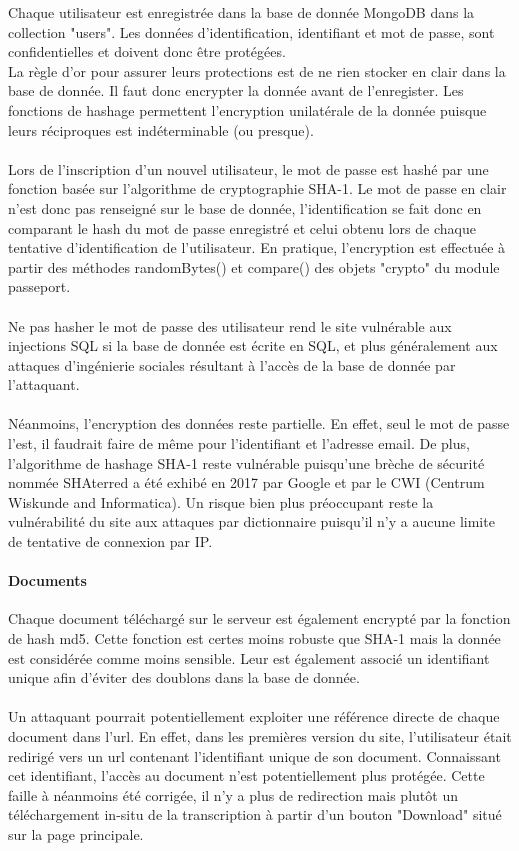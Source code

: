 \documentclass[oneside,a4paper,13pt]{article}
\begin{document}
Chaque utilisateur est enregistrée dans la base de donnée MongoDB dans la collection "users". Les données d'identification, identifiant et mot de passe, sont confidentielles et doivent donc être protégées. \\
La règle d'or pour assurer leurs protections est de ne rien stocker en clair dans la base de donnée. Il faut donc encrypter la donnée avant de l'enregister. Les fonctions de hashage permettent l'encryption unilatérale de la donnée puisque leurs réciproques est indéterminable (ou presque). \\ \\
Lors de l'inscription d'un nouvel utilisateur, le mot de passe est hashé par une fonction basée sur l'algorithme de cryptographie SHA-1. Le mot de passe en clair n'est donc pas renseigné sur le base de donnée, l'identification se fait donc en comparant le hash du mot de passe enregistré et celui obtenu lors de chaque tentative d'identification de l'utilisateur. En pratique, l'encryption est effectuée à partir des méthodes randomBytes() et compare() des objets "crypto" du module passeport.\\ \\
Ne pas hasher le mot de passe des utilisateur rend le site vulnérable aux injections SQL si la base de donnée est écrite en SQL, et plus généralement aux attaques d'ingénierie sociales résultant à l'accès de la base de donnée par l'attaquant. \\ \\
Néanmoins, l'encryption des données reste partielle. En effet, seul le mot de passe l'est, il faudrait faire de même pour l'identifiant et l'adresse email. De plus, l'algorithme de hashage SHA-1 reste vulnérable puisqu'une brèche de sécurité nommée SHAterred a été exhibé en 2017 par Google et par le CWI (Centrum Wiskunde and Informatica). Un risque bien plus préoccupant reste la vulnérabilité du site aux attaques par dictionnaire puisqu'il n'y a aucune limite de tentative de connexion par IP. 

\paragraph{Documents}

Chaque document téléchargé sur le serveur est également encrypté par la fonction de hash md5. Cette fonction est certes moins robuste que SHA-1 mais la donnée est considérée comme moins sensible. Leur est également associé un identifiant unique afin d'éviter des doublons dans la base de donnée. \\ \\
Un attaquant pourrait potentiellement exploiter une référence directe de chaque document dans l'url. En effet, dans les premières version du site, l'utilisateur était redirigé vers un url contenant l'identifiant unique de son document. Connaissant cet identifiant, l'accès au document n'est potentiellement plus protégée. Cette faille à néanmoins  été corrigée, il n'y a plus de redirection mais plutôt un téléchargement in-situ de la transcription à partir d'un bouton "Download" situé sur la page principale.
\end{document}
